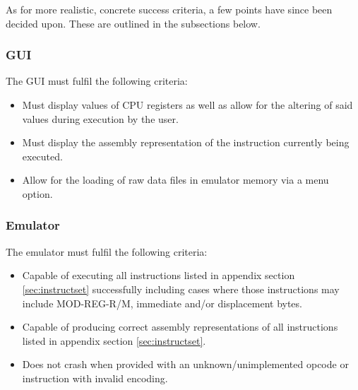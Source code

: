     As for more realistic, concrete success criteria, a few points have since been decided upon. These are outlined in the subsections below.

    \subsubsection{GUI}
        The GUI must fulfil the following criteria:
        \begin{itemize}
            \item Must display values of CPU registers as well as allow for the altering of said values during execution by the user.
            \item Must display the assembly representation of the instruction currently being executed.
            \item Allow for the loading of raw data files in emulator memory via a menu option.
        \end{itemize}

    \subsubsection{Emulator}
        The emulator must fulfil the following criteria:
        \begin{itemize}
            \item Capable of executing all instructions listed in appendix section \ref{sec:instructset} successfully including cases where those instructions may include MOD-REG-R/M, immediate and/or displacement bytes.
            \item Capable of producing correct assembly representations of all instructions listed in appendix section \ref{sec:instructset}.
            \item Does not crash when provided with an unknown/unimplemented opcode or instruction with invalid encoding.
        \end{itemize}